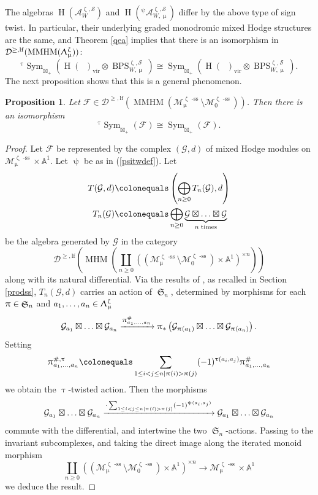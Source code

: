 \documentclass[a4paper,10pt]{amsart}
\renewcommand{\zeta}{\upzeta}
\renewcommand{\pi}{\uppi\hspace{0.05em}}
\renewcommand{\Lambda}{\Uplambda}
\renewcommand{\psi}{\uppsi}
\renewcommand{\tau}{\uptau}
\renewcommand{\mu}{\upmu}
\newtheorem{proposition}[theorem]{Proposition}
\DeclareMathOperator{\BC}{B\mathbb{C}^*}
\newcommand{\SP}{\mathcal{S}}
\newcommand{\Msp}{\mathcal{M}}
\DeclareMathOperator{\sst}{-ss}
\DeclareMathOperator{\MMHM}{MMHM}
\DeclareMathOperator{\MHM}{MHM}
\DeclareMathOperator{\DT}{BPS}
\DeclareMathOperator{\Sym}{Sym}
\DeclareMathOperator{\SSym}{\mathfrak{S}}
\DeclareMathOperator{\vir}{vir}
\DeclareMathOperator{\HO}{H}
\newcommand{\Dulf}{\mathcal{D}^{\geq, \mathrm{lf}}}
\begin{document}
The algebras $\HO\left(\mathcal{A}_{W}^{\zeta,\SP}\right)$ and $\HO(^{\psi}\!\!\mathcal{A}_{W,\mu}^{\zeta,\SP})$ differ by the above type of sign twist.  In particular, their underlying graded monodromic mixed Hodge structures are the same, and Theorem \ref{qea} implies that there is an isomorphism in $\Dulf(\MMHM(\Lambda_{\mu}^{\zeta}))$:
\[
{}^{\tau}\!\Sym_{\boxtimes_+}\left(\HO(\BC)_{\vir}\otimes \DT_{W,\mu}^{\zeta,\SP}\right)\cong{}\Sym_{\boxtimes_+}\left(\HO(\BC)_{\vir}\otimes \DT_{W,\mu}^{\zeta,\SP}\right).
\]
The next proposition shows that this is a general phenomenon.
\begin{proposition}
\label{underlying_same}
Let $\mathcal{F}\in\Dulf(\MMHM(\Msp_{\mu}^{\zeta\sst}\setminus\Msp_0^{\zeta\sst}))$.  Then there is an isomorphism
\[
{}^{\tau}\Sym_{\boxtimes_+}(\mathcal{F})\cong\Sym_{\boxtimes_+}(\mathcal{F}).
\]
\end{proposition}
\begin{proof}
Let $\mathcal{F}$ be represented by the complex $(\mathcal{G},d)$ of mixed Hodge modules on $\Msp_{\mu}^{\zeta\sst}\times\mathbb{A}^1$.  Let $\psi$ be as in (\ref{psitwdef}).  Let 
\begin{align*}
T(\mathcal{G},d)\colonequals &\left(\bigoplus_{n\geq 0}T_n(\mathcal{G}),d\right)\\
T_n(\mathcal{G})\colonequals &\bigoplus_{n\geq 0}\underbrace{\mathcal{G}\boxtimes\ldots\boxtimes \mathcal{G}}_{n \;\textrm{times}}
\end{align*}
be the algebra generated by $\mathcal{G}$ in the category 
\[
\Dulf\left(\MHM\left(\coprod_{n\geq 0}\left((\Msp_{\mu}^{\zeta\sst}\setminus\Msp_0^{\zeta\sst})\times\mathbb{A}^1\right)^{\times n}\right)\right)
\]
along with its natural differential.  Via the results of \cite{MSS11}, as recalled in Section \ref{prodss}, $T_n(\mathcal{G},d)$ carries an action of $\SSym_n$, determined by morphisms for each $\pi\in\SSym_n$ and $a_1,\ldots,a_n\in\Lambda_{\mu}^{\zeta}$
\[
\mathcal{G}_{a_1}\boxtimes\ldots\boxtimes\mathcal{G}_{a_n}\xrightarrow{\pi^{\#}_{a_1,\ldots,a_n}}\pi_*\left(\mathcal{G}_{\pi(a_1)}\boxtimes\ldots\boxtimes\mathcal{G}_{\pi(a_n)}\right).
\]
Setting
\[
\pi^{\#,\tau}_{a_1,\ldots,a_n}\colonequals \sum_{1\leq i<j\leq n|\pi(i)>\pi(j)}(-1)^{\tau(a_i,a_j)}\pi^{\#}_{a_1,\ldots,a_n}
\]
we obtain the $\tau$-twisted action.  Then the morphisms
\[
\mathcal{G}_{a_1}\boxtimes\ldots\boxtimes\mathcal{G}_{a_n}\xrightarrow{\cdot\sum_{1\leq i<j\leq n|\pi(i)>\pi(j)}(-1)^{\psi(a_i,a_j)}}\mathcal{G}_{a_1}\boxtimes\ldots\boxtimes\mathcal{G}_{a_n}
\]
commute with the differential, and intertwine the two $\SSym_n$-actions.  Passing to the invariant subcomplexes, and taking the direct image along the iterated monoid morphism
\[
\coprod_{n\geq 0}\left((\Msp_{\mu}^{\zeta\sst}\setminus\Msp_0^{\zeta\sst})\times\mathbb{A}^1\right)^{\times n}\rightarrow \Msp_{\mu}^{\zeta\sst}\times\mathbb{A}^1
\]
we deduce the result.
\end{proof}
\end{document}
